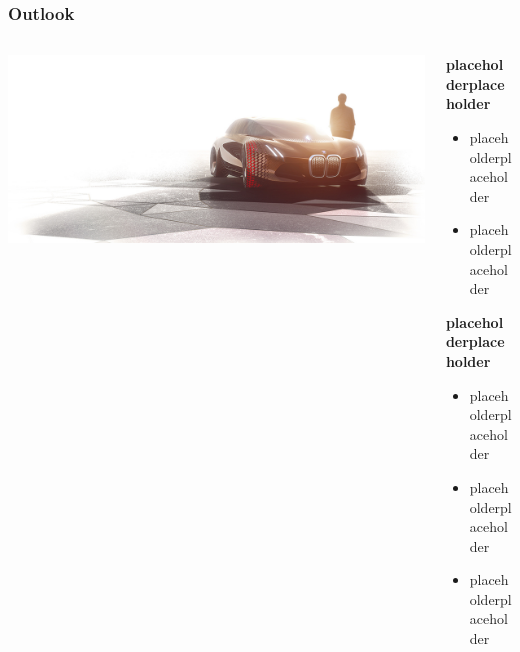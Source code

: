 \begin{frame}
\frametitle{Outlook}
\begin{PraesentationAufzaehlung}


\begin{columns}
\begin{column}{0.4\textwidth}
\begin{center}
\includegraphics[scale=0.75]{images/bmw2.png}
\end{center}
\end{column}
\begin{column}{0.6\textwidth}
\item \textbf{placeholderplaceholder}
\begin{itemize}
\item	placeholderplaceholder
\item 	placeholderplaceholder
\end{itemize}	

\vspace{-8mm}

\item \textbf{placeholderplaceholder}
\begin{itemize}
\item placeholderplaceholder
\item placeholderplaceholder
\item placeholderplaceholder
\end{itemize}
\end{column}
\end{columns}
\end{PraesentationAufzaehlung}
\vspace{-2mm}


\end{frame}
\clearpage
